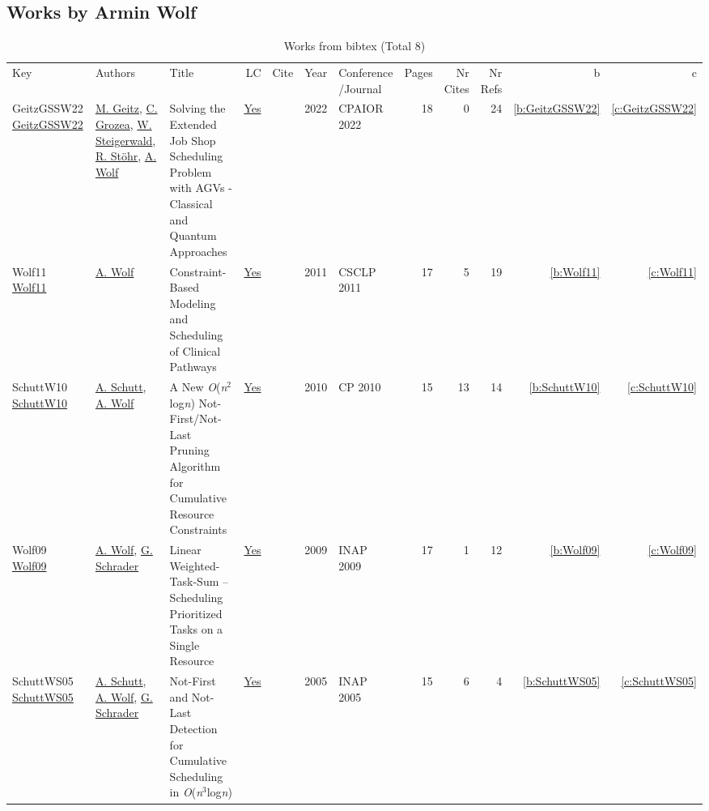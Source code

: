 \subsection{Works by Armin Wolf}
\label{sec:a51}
{\scriptsize
\begin{longtable}{>{\raggedright\arraybackslash}p{3cm}>{\raggedright\arraybackslash}p{6cm}>{\raggedright\arraybackslash}p{6.5cm}rrrp{2.5cm}rrrrr}
\rowcolor{white}\caption{Works from bibtex (Total 8)}\\ \toprule
\rowcolor{white}Key & Authors & Title & LC & Cite & Year & \shortstack{Conference\\/Journal} & Pages & \shortstack{Nr\\Cites} & \shortstack{Nr\\Refs} & b & c \\ \midrule\endhead
\bottomrule
\endfoot
GeitzGSSW22 \href{https://doi.org/10.1007/978-3-031-08011-1\_10}{GeitzGSSW22} & \hyperref[auth:a47]{M. Geitz}, \hyperref[auth:a48]{C. Grozea}, \hyperref[auth:a49]{W. Steigerwald}, \hyperref[auth:a50]{R. St{\"{o}}hr}, \hyperref[auth:a51]{A. Wolf} & Solving the Extended Job Shop Scheduling Problem with AGVs - Classical and Quantum Approaches & \href{works/GeitzGSSW22.pdf}{Yes} & \cite{GeitzGSSW22} & 2022 & CPAIOR 2022 & 18 & 0 & 24 & \ref{b:GeitzGSSW22} & \ref{c:GeitzGSSW22}\\
Wolf11 \href{http://dx.doi.org/10.1007/978-3-642-19486-3_8}{Wolf11} & \hyperref[auth:a51]{A. Wolf} & Constraint-Based Modeling and Scheduling of Clinical Pathways & \href{works/Wolf11.pdf}{Yes} & \cite{Wolf11} & 2011 & CSCLP 2011 & 17 & 5 & 19 & \ref{b:Wolf11} & \ref{c:Wolf11}\\
SchuttW10 \href{https://doi.org/10.1007/978-3-642-15396-9\_36}{SchuttW10} & \hyperref[auth:a125]{A. Schutt}, \hyperref[auth:a51]{A. Wolf} & A New \emph{O}(\emph{n}\({}^{\mbox{2}}\)log\emph{n}) Not-First/Not-Last Pruning Algorithm for Cumulative Resource Constraints & \href{works/SchuttW10.pdf}{Yes} & \cite{SchuttW10} & 2010 & CP 2010 & 15 & 13 & 14 & \ref{b:SchuttW10} & \ref{c:SchuttW10}\\
Wolf09 \href{http://dx.doi.org/10.1007/978-3-642-00675-3_2}{Wolf09} & \hyperref[auth:a51]{A. Wolf}, \hyperref[auth:a720]{G. Schrader} & Linear Weighted-Task-Sum – Scheduling Prioritized Tasks on a Single Resource & \href{works/Wolf09.pdf}{Yes} & \cite{Wolf09} & 2009 & INAP 2009 & 17 & 1 & 12 & \ref{b:Wolf09} & \ref{c:Wolf09}\\
SchuttWS05 \href{https://doi.org/10.1007/11963578\_6}{SchuttWS05} & \hyperref[auth:a125]{A. Schutt}, \hyperref[auth:a51]{A. Wolf}, \hyperref[auth:a720]{G. Schrader} & Not-First and Not-Last Detection for Cumulative Scheduling in \emph{O}(\emph{n}\({}^{\mbox{3}}\)log\emph{n}) & \href{works/SchuttWS05.pdf}{Yes} & \cite{SchuttWS05} & 2005 & INAP 2005 & 15 & 6 & 4 & \ref{b:SchuttWS05} & \ref{c:SchuttWS05}\\

\end{longtable}}
